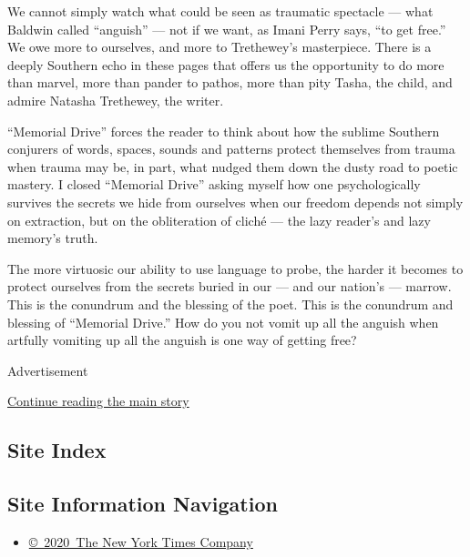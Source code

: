We cannot simply watch what could be seen as traumatic spectacle ---
what Baldwin called ``anguish'' --- not if we want, as Imani Perry says,
``to get free.'' We owe more to ourselves, and more to Trethewey's
masterpiece. There is a deeply Southern echo in these pages that offers
us the opportunity to do more than marvel, more than pander to pathos,
more than pity Tasha, the child, and admire Natasha Trethewey, the
writer.

``Memorial Drive'' forces the reader to think about how the sublime
Southern conjurers of words, spaces, sounds and patterns protect
themselves from trauma when trauma may be, in part, what nudged them
down the dusty road to poetic mastery. I closed ``Memorial Drive''
asking myself how one psychologically survives the secrets we hide from
ourselves when our freedom depends not simply on extraction, but on the
obliteration of cliché --- the lazy reader's and lazy memory's truth.

The more virtuosic our ability to use language to probe, the harder it
becomes to protect ourselves from the secrets buried in our --- and our
nation's --- marrow. This is the conundrum and the blessing of the poet.
This is the conundrum and blessing of ``Memorial Drive.'' How do you not
vomit up all the anguish when artfully vomiting up all the anguish is
one way of getting free?

Advertisement

\protect\hyperlink{after-bottom}{Continue reading the main story}

\hypertarget{site-index}{%
\subsection{Site Index}\label{site-index}}

\hypertarget{site-information-navigation}{%
\subsection{Site Information
Navigation}\label{site-information-navigation}}

\begin{itemize}
\tightlist
\item
  \href{https://help.nytimes3xbfgragh.onion/hc/en-us/articles/115014792127-Copyright-notice}{©~2020~The
  New York Times Company}
\end{itemize}

